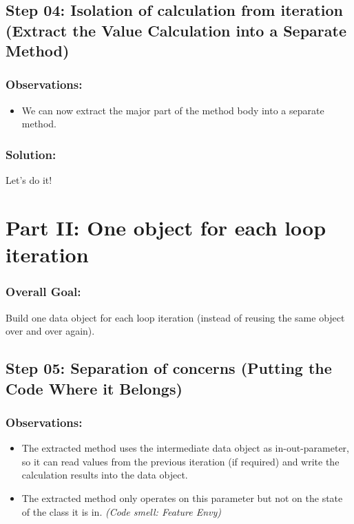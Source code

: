 \documentclass[a4paper,fleqn,titlepage,11pt]{article}
\begin{document}
\subsection*{Step 04: Isolation of calculation from iteration (Extract the Value Calculation into a Separate Method)}

\subsubsection*{Observations:}
\begin{itemize}
\item We can now extract the major part of the method body into a separate method.
\end{itemize}

\subsubsection*{Solution:}

Let's do it!

\section*{Part II: One object for each loop iteration}

\subsubsection*{Overall Goal:}

Build one data object for each loop iteration (instead of reusing the same object over and over again).


\subsection*{Step 05: Separation of concerns (Putting the Code Where it Belongs)}

\subsubsection*{Observations:}
\begin{itemize}
\item The extracted method uses the intermediate data object as in-out-parameter, so it can read values from the previous iteration (if required) and write the calculation results into the data object.
\item The extracted method only operates on this parameter but not on the state of the class it is in. {\em (Code smell: Feature Envy)}
\end{itemize}
\end{document}
